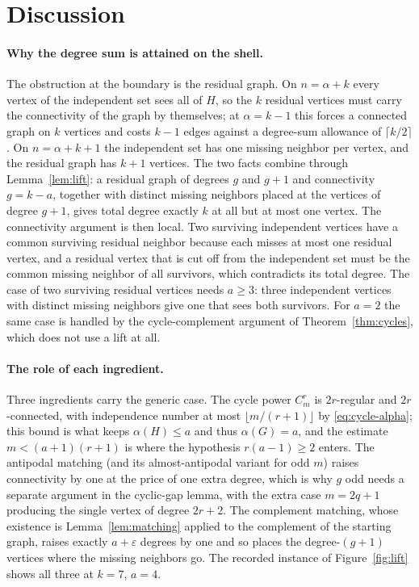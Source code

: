 \section{Discussion}\label{sec:discussion}

\paragraph{Why the degree sum is attained on the shell.}
The obstruction at the boundary is the residual graph.
On $n=\alpha+k$ every vertex of the independent set sees all of $H$, so the $k$ residual vertices must carry the connectivity of the graph by themselves; at $\alpha=k-1$ this forces a connected graph on $k$ vertices and costs $k-1$ edges against a degree-sum allowance of $\lceil k/2\rceil$ \cite{DG}.
On $n=\alpha+k+1$ the independent set has one missing neighbor per vertex, and the residual graph has $k+1$ vertices.
The two facts combine through Lemma~\ref{lem:lift}: a residual graph of degrees $g$ and $g+1$ and connectivity $g=k-a$, together with distinct missing neighbors placed at the vertices of degree $g+1$, gives total degree exactly $k$ at all but at most one vertex.
The connectivity argument is then local.
Two surviving independent vertices have a common surviving residual neighbor because each misses at most one residual vertex, and a residual vertex that is cut off from the independent set must be the common missing neighbor of all survivors, which contradicts its total degree.
The case of two surviving residual vertices needs $a\ge3$: three independent vertices with distinct missing neighbors give one that sees both survivors.
For $a=2$ the same case is handled by the cycle-complement argument of Theorem~\ref{thm:cycles}, which does not use a lift at all.

\paragraph{The role of each ingredient.}
Three ingredients carry the generic case.
The cycle power $C_m^r$ is $2r$-regular and $2r$-connected, with independence number at most $\lfloor m/(r+1)\rfloor$ by \eqref{eq:cycle-alpha}; this bound is what keeps $\alpha(H)\le a$ and thus $\alpha(G)=a$, and the estimate $m<(a+1)(r+1)$ is where the hypothesis $r(a-1)\ge2$ enters.
The antipodal matching (and its almost-antipodal variant for odd $m$) raises connectivity by one at the price of one extra degree, which is why $g$ odd needs a separate argument in the cyclic-gap lemma, with the extra case $m=2q+1$ producing the single vertex of degree $2r+2$.
The complement matching, whose existence is Lemma~\ref{lem:matching} applied to the complement of the starting graph, raises exactly $a+\varepsilon$ degrees by one and so places the degree-$(g+1)$ vertices where the missing neighbors go.
The recorded instance of Figure~\ref{fig:lift} shows all three at $k=7$, $a=4$.

